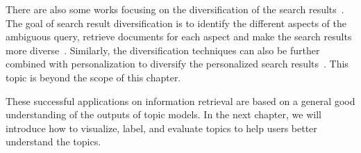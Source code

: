 There are also some works focusing on the diversification of the search results~\citep{Dang-2013,Santos-2015}. The goal of search result diversification is to identify the different aspects of the ambiguous query, retrieve documents for each aspect and make the search results more diverse~\citep{Dang-2013}. Similarly, the diversification techniques can also be further combined with personalization to diversify the personalized search results~\citep{Vallet-2012,Liang-2014}. This topic is beyond the scope of this chapter.

These successful applications on information retrieval are based on a general good
understanding of the outputs of topic models. In the next chapter, we
will introduce how to visualize, label, and evaluate topics to
help users better understand the topics.
